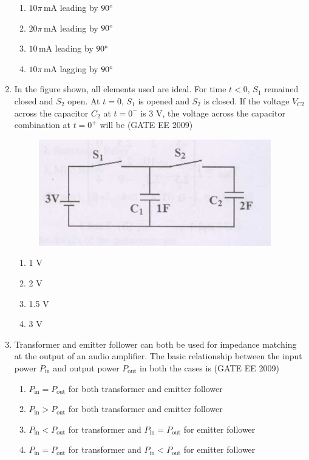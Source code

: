 \documentclass[journal,12pt,onecolumn]{IEEEtran}
\theoremstyle{remark}
\begin{document}
\begin{flushleft}
\begin{enumerate}
\begin{enumerate}
    \item $10 \pi\,\text{mA}$ leading by $90\degree$
    \item $20 \pi\,\text{mA}$ leading by $90\degree$
    \item $10\,\text{mA}$ leading by $90\degree$
    \item $10 \pi\,\text{mA}$ lagging by $90\degree$
\end{enumerate}


\item In the figure shown, all elements used are ideal. For time $t < 0$, $S_1$ remained closed and $S_2$ open. At $t=0$, $S_1$ is opened and $S_2$ is closed. If the voltage $V_{C2}$ across the capacitor $C_2$ at $t=0^{-}$ is 3 V, the voltage across the capacitor combination at $t=0^{+}$ will be
\hfill(GATE EE 2009)
\begin{figure}[h!]
    \centering
    \includegraphics[width=0.5\columnwidth]{figs/Screenshot 2025-08-08 200324.png}
    \caption{}
    \label{fig:placeholder}
\end{figure}
\begin{enumerate}
    \item 1 V
    \item 2 V
    \item 1.5 V
    \item 3 V
\end{enumerate}

\item Transformer and emitter follower can both be used for impedance matching at the output of an audio amplifier. The basic relationship between the input power $P_{\text{in}}$ and output power $P_{\text{out}}$ in both the cases is
\hfill(GATE EE 2009)
\begin{enumerate}
    \item $P_{\text{in}} = P_{\text{out}}$ for both transformer and emitter follower
    \item $P_{\text{in}} > P_{\text{out}}$ for both transformer and emitter follower
    \item $P_{\text{in}} < P_{\text{out}}$ for transformer and $P_{\text{in}} = P_{\text{out}}$ for emitter follower
    \item $P_{\text{in}} = P_{\text{out}}$ for transformer and $P_{\text{in}} < P_{\text{out}}$ for emitter follower
\end{enumerate}




\end{enumerate}
\end{flushleft}
\end{document}
